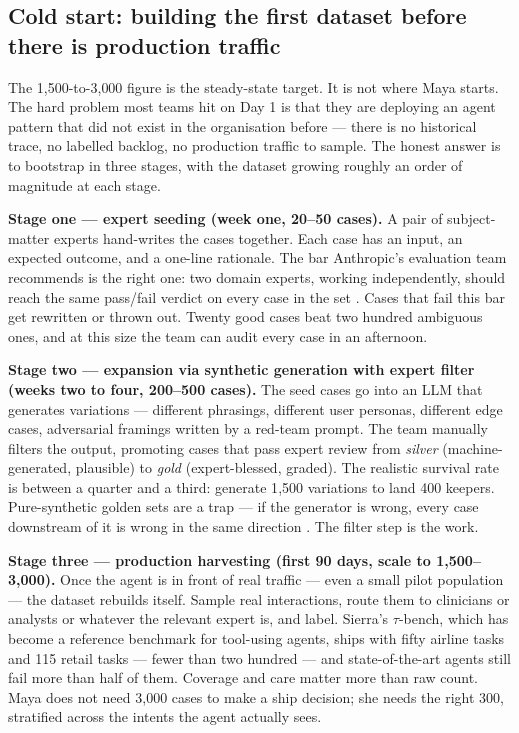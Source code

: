 \subsection*{Cold start: building the first dataset before there is production traffic}

The 1{,}500-to-3{,}000 figure is the steady-state target. It is not where Maya starts. The hard problem most teams hit on Day 1 is that they are deploying an agent pattern that did not exist in the organisation before --- there is no historical trace, no labelled backlog, no production traffic to sample. The honest answer is to bootstrap in three stages, with the dataset growing roughly an order of magnitude at each stage.

\textbf{Stage one --- expert seeding (week one, 20--50 cases).} A pair of subject-matter experts hand-writes the cases together. Each case has an input, an expected outcome, and a one-line rationale. The bar Anthropic's evaluation team recommends is the right one: two domain experts, working independently, should reach the same pass/fail verdict on every case in the set \citep{anthropicEvalsAgents2024}. Cases that fail this bar get rewritten or thrown out. Twenty good cases beat two hundred ambiguous ones, and at this size the team can audit every case in an afternoon.

\textbf{Stage two --- expansion via synthetic generation with expert filter (weeks two to four, 200--500 cases).} The seed cases go into an LLM that generates variations --- different phrasings, different user personas, different edge cases, adversarial framings written by a red-team prompt. The team manually filters the output, promoting cases that pass expert review from \textit{silver} (machine-generated, plausible) to \textit{gold} (expert-blessed, graded). The realistic survival rate is between a quarter and a third: generate 1{,}500 variations to land 400 keepers. Pure-synthetic golden sets are a trap --- if the generator is wrong, every case downstream of it is wrong in the same direction \citep{evidentlySynthetic2024}. The filter step is the work.

\textbf{Stage three --- production harvesting (first 90 days, scale to 1{,}500--3{,}000).} Once the agent is in front of real traffic --- even a small pilot population --- the dataset rebuilds itself. Sample real interactions, route them to clinicians or analysts or whatever the relevant expert is, and label. Sierra's $\tau$-bench, which has become a reference benchmark for tool-using agents, ships with fifty airline tasks and 115 retail tasks \citep{yao2024taubench} --- fewer than two hundred --- and state-of-the-art agents still fail more than half of them. Coverage and care matter more than raw count. Maya does not need 3{,}000 cases to make a ship decision; she needs the right 300, stratified across the intents the agent actually sees.

